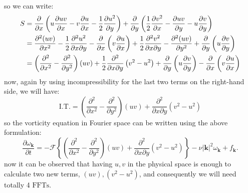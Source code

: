 \documentclass[12pt]{article}
\def\k{\bm{k}}
\begin{document}
%
so we can write:
%
\begin{align}\label{Eq-20}
S &= \dfrac{\partial}{\partial x} \left(u\dfrac{\partial uv}{\partial x}-v\dfrac{\partial u}{\partial x}-\dfrac{1}{2}\dfrac{\partial u^2}{\partial y}\right)+\dfrac{\partial}{\partial y} \left(\dfrac{1}{2}\dfrac{\partial v^2}{\partial x}- \dfrac{\partial uv}{\partial y}-u\dfrac{\partial v}{\partial y}\right) \notag \\
&= \dfrac{\partial^2 (uv)}{\partial x^2}-\dfrac{1}{2}\dfrac{\partial^2 u^2}{\partial x \partial y}-\dfrac{\partial }{\partial x}\left(v\dfrac{\partial u}{\partial x}\right)+\dfrac{1}{2}\dfrac{\partial^2 v^2}{\partial x \partial y}-\dfrac{\partial^2 (uv)}{\partial y^2}+\dfrac{\partial }{\partial y}\left(u\dfrac{\partial v}{\partial y}\right) \\
&= \left(\dfrac{\partial^2}{\partial x^2}-\dfrac{\partial^2}{\partial y^2}\right)(uv)+\dfrac{1}{2}\dfrac{\partial^2}{\partial x \partial y}\left(v^2 - u^2 \right)+\dfrac{\partial }{\partial y}\left(u\dfrac{\partial v}{\partial y}\right)-\dfrac{\partial }{\partial x}\left(v\dfrac{\partial u}{\partial x}\right) \notag
\end{align}
%
now, again by using incompressibility for the last two terms on the right-hand side, we will have:
%
\begin{equation}\label{Eq-21}
\text{I.T.} =\left(\dfrac{\partial^2}{\partial x^2}-\dfrac{\partial^2}{\partial y^2}\right)(uv)+\dfrac{\partial^2}{\partial x \partial y}\left(v^2 - u^2 \right)
\end{equation}
%
so the vorticity equation in Fourier space can be written using the above formulation:
%
\begin{equation}\label{Eq-22}
\frac{\partial\omega_{\k}}{\partial t} =- \mathcal{F}\left\lbrace\left(\dfrac{\partial^2}{\partial x^2}-\dfrac{\partial^2}{\partial y^2}\right)(uv)+\dfrac{\partial^2}{\partial x \partial y}\left(v^2 - u^2 \right)\right\rbrace-\nu{|\k|}^2\omega_{\k} + f_{\k}.
\end{equation}
%
now it can be observed that having $u,v$ in the physical space is enough to calculate two new terms, $(uv), (v^2 - u^2)$, and consequently we will need totally 4 $\text{FFTs}$.
\end{document}
